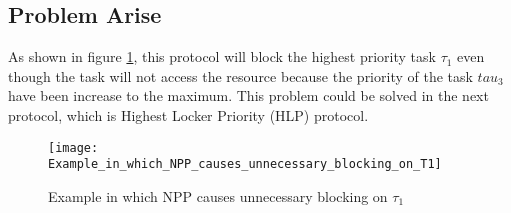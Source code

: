 %



\subsection{Problem Arise}

As shown in figure \ref{fig:Example_in_which_NPP_causes_unnecessary_blocking_on_T1}, this protocol will block the highest priority task $ \tau_{1} $ even though the task will not access the resource because the priority of the task $tau_{3}$ have been increase to the maximum. This problem could be solved in the next protocol, which is Highest Locker Priority (HLP) protocol.

\begin{figure}[h]
    \centering
    \texttt{[image: Example\_in\_which\_NPP\_causes\_unnecessary\_blocking\_on\_T1]}
    \caption{Example in which NPP causes unnecessary blocking on $ \tau_{1} $ \cite{b5}}
    \label{fig:Example_in_which_NPP_causes_unnecessary_blocking_on_T1}
\end{figure}



 
